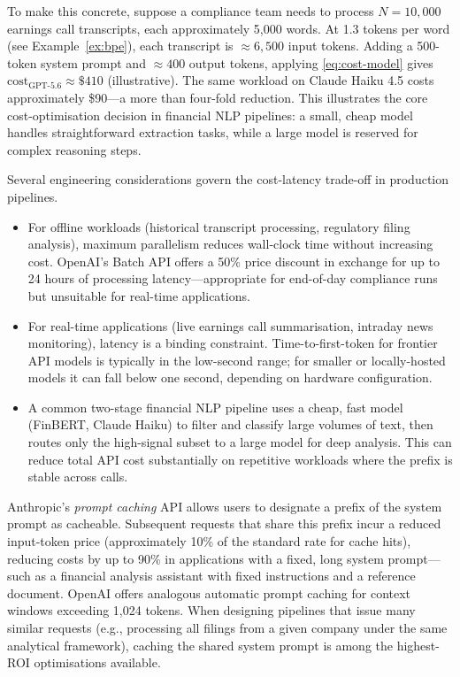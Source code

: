 \begin{context}
To make this concrete, suppose a compliance team needs to process $N = 10{,}000$ earnings call transcripts,
each approximately 5,000 words.  At 1.3 tokens per word (see
Example~\ref{ex:bpe}), each transcript is $\approx 6{,}500$ input tokens.  Adding a
500-token system prompt and $\approx 400$ output tokens, applying
\eqref{eq:cost-model} gives $\text{cost}_{\text{GPT-5.6}} \approx \$410$ (illustrative).
The same workload on Claude Haiku 4.5 costs approximately \$90---a more than four-fold
reduction.  This illustrates the core cost-optimisation decision in financial NLP
pipelines: a small, cheap model handles straightforward extraction tasks, while a
large model is reserved for complex reasoning steps.

Several engineering considerations govern the cost-latency trade-off in production pipelines.
\begin{itemize}
  \item For offline workloads (historical transcript processing,
    regulatory filing analysis), maximum parallelism reduces wall-clock
    time without increasing cost.  OpenAI's Batch API offers a 50\%
    price discount in exchange for up to 24 hours of processing
    latency---appropriate for end-of-day compliance runs but unsuitable
    for real-time applications.
  \item For real-time applications (live earnings call summarisation,
    intraday news monitoring), latency is a binding constraint.
    Time-to-first-token for frontier API models is typically in the low-second range; for smaller or locally-hosted models it can fall below one second, depending on hardware configuration.
  \item A common two-stage financial NLP pipeline uses a cheap, fast
    model (FinBERT, Claude Haiku) to filter and classify large volumes
    of text, then routes only the high-signal subset to a large model
    for deep analysis.  This can reduce total API cost substantially on repetitive workloads where the prefix is stable across calls.
\end{itemize}

\begin{remark}
\label{rem:prompt-caching}
Anthropic's \emph{prompt caching} API allows users to designate a prefix of the
system prompt as cacheable.  Subsequent requests that share this prefix incur a
reduced input-token price (approximately 10\% of the standard rate for cache hits),
reducing costs by up to 90\% in applications with a fixed, long system prompt---such
as a financial analysis assistant with fixed instructions and a reference document.
OpenAI offers analogous automatic prompt caching for context windows exceeding 1,024
tokens.  When designing pipelines that issue many similar requests (e.g., processing
all filings from a given company under the same analytical framework), caching the
shared system prompt is among the highest-ROI optimisations available.
\end{remark}

\end{context}

